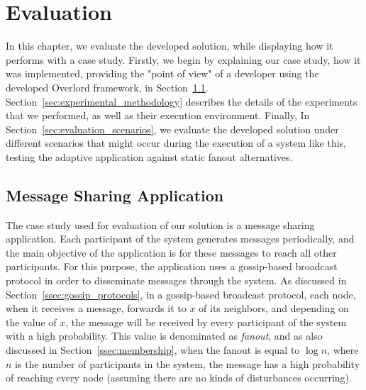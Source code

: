 
%

\chapter{Evaluation}
\label{cha:evaluation}

\epigraphfontsize{\small\itshape}
\setlength\epigraphwidth{12.5cm}
\setlength\epigraphrule{0pt}
%
%
%

In this chapter, we evaluate the developed solution, while displaying how it performs with a case study. Firstly, we begin by explaining our case study, how it was implemented, providing the "point of view" of a developer using the developed Overlord framework, in Section~\ref{sec:message_sharing_application}. Section~\ref{sec:experimental_methodology} describes the details of the experiments that we performed, as well as their execution environment. Finally, In Section~\ref{sec:evaluation_scenarios}, we evaluate the developed solution under different scenarios that might occur during the execution of a system like this, testing the adaptive application against static fanout alternatives.

\section{Message Sharing Application}
\label{sec:message_sharing_application}
The case study used for evaluation of our solution is a message sharing application. Each participant of the system generates messages periodically, and the main objective of the application is for these messages to reach all other participants. For this purpose, the application uses a gossip-based broadcast protocol in order to disseminate messages through the system. As discussed in Section~\ref{ssec:gossip_protocols}, in a gossip-based broadcast protocol, each node, when it receives a message, forwards it to $x$ of its neighbors, and depending on the value of $x$, the message will be received by every participant of the system with a high probability. This value is denominated as \textit{fanout}, and as also discussed in Section~\ref{ssec:membership}, when the fanout is equal to $\log{n}$, where $n$ is the number of participants in the system, the message has a high probability of reaching every node (assuming there are no kinds of disturbances occurring)\cite{Leitao2010a, Kermarrec2003}.

